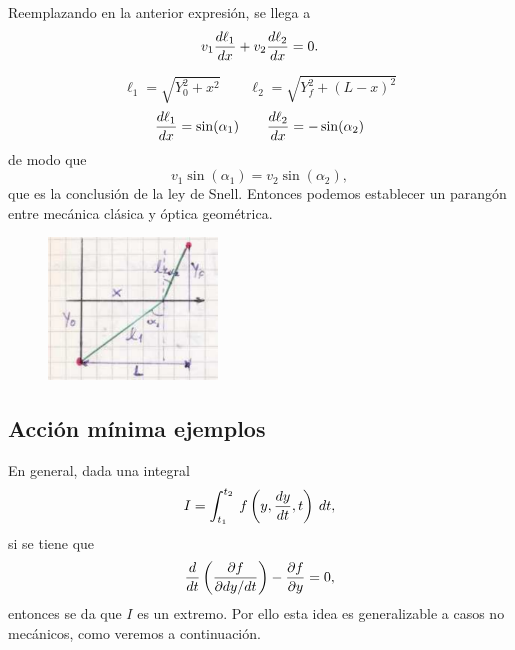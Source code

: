 \documentclass[10pt,oneside]{CBFT_book}
\begin{document}
Reemplazando en la anterior expresión, se llega a
\[
	v_1 \frac{d^{\hspace{-0.05em}} {\ell_1}}{d {x}^{\hspace{-0.05em}}} + v_2 \frac{d^{\hspace{-0.05em}} {\ell_2}}{d {x}^{\hspace{-0.05em}}} = 0.
\]

\[
	\ell_1 = \sqrt{ Y_0^2 + x^2 } \qquad \ell_2 = \sqrt{ Y_f^2 + (L-x)^2 }
\]
\[
	\frac{d^{\hspace{-0.05em}} {\ell_1}}{d {x}^{\hspace{-0.05em}}} = \sin(\alpha_1) \qquad \frac{d^{\hspace{-0.05em}} {\ell_2}}{d {x}^{\hspace{-0.05em}}} = -\sin(\alpha_2)
\]
de modo que 
\[
	v_1 \sin( \alpha_1 ) = v_2 \sin( \alpha_2 ),
\]
que es la conclusión de la ley de Snell. Entonces podemos establecer un parangón entre mecánica clásica
y óptica geométrica.

\begin{figure}[htb]
	\begin{center}
	\includegraphics[width=0.4\textwidth]{images/fig_mc_snell2.pdf}	 
	\end{center}
	\caption{}
	\label{fig_mc_snell2}
\end{figure}

\subsection{Acción mínima ejemplos}

En general, dada una integral
\[
	I = \int_{t_1}^{t_2} \: f\left(y,\frac{d^{\hspace{-0.05em}} {y}}{d {t}^{\hspace{-0.05em}}},t\right) \: dt,
\]
si se tiene que 
\[
	\frac{d^{\hspace{-0.05em}} {}}{d {t}^{\hspace{-0.05em}}}\left( \frac{\partial^{\hspace{-0.05em}} {f}}{\partial {dy/dt}^{\hspace{-0.05em}}} \right) - \frac{\partial^{\hspace{-0.05em}} {f}}{\partial {y}^{\hspace{-0.05em}}} = 0,
\]
entonces se da que $I$ es un extremo. Por ello esta idea es generalizable a casos no mecánicos, como veremos a 
continuación.
\end{document}
